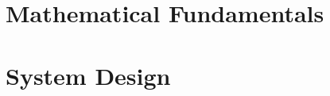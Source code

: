 \appendix


\toclineskip
\section{Mathematical Fundamentals}



\newpage


\toclineskip
\section{System Design}


